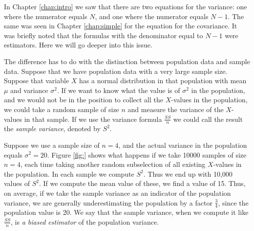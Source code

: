 \documentclass[]{book}\usepackage[]{graphicx}\usepackage[]{color}
\begin{document}
In Chapter \ref{chap:intro} we saw that there are two equations for the variance: one where the numerator equals $N$, and one where the numerator equals $N-1$. The same was seen in Chapter \ref{chap:simple} for the equation for the covariance. It was briefly noted that the formulas with the denominator equal to $N-1$ were estimators. Here we will go deeper into this issue. 

The difference has to do with the distinction between population data and sample data. Suppose that we have population data with a very large sample size. Suppose that variable $X$ has a normal distribution in that population with mean $\mu$ and variance $\sigma^2$. If we want to know what the value is of $\sigma^2$ in the population, and we would not be in the position to collect all the $X$-values in the population, we could take a random sample of size $n$ and measure the variance of the $X$-values in that sample. If we use the variance formula $\frac{SS}{n}$ we could call the result the \textit{sample variance}, denoted by $S^2$.

Suppose we use a sample size of $n=4$, and the actual variance in the population equals $\sigma^2 = 20$. Figure \ref{fig:} shows what happens if we take 10000 samples of size $n=4$, each time taking another random subselection of all existing $X$-values in the population. In each sample we compute $S^2$. Thus we end up with 10,000 values of $S^2$. If we compute the mean value of these, we find a value of 15. Thus, on average, if we take the sample variance as an indicator of the population variance, we are generally underestimating the population by a factor $\frac{3}{4}$, since the population value is 20. We say that the sample variance, when we compute it like $\frac{SS}{n}$, is \textit{a biased estimator} of the population variance. 
\end{document}
